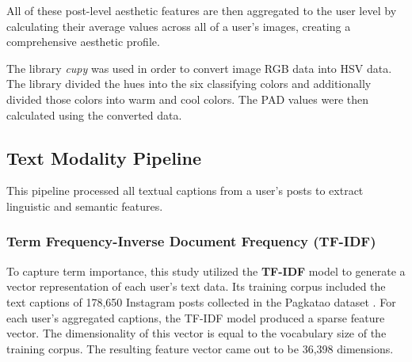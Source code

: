 All of these post-level aesthetic features are then aggregated to the user level by calculating their average values across all of a user's images, creating a comprehensive aesthetic profile.

The library \textit{cupy} \citep{Okuta2017CuPyA} was used in order to convert image RGB data into HSV data. The library divided the hues into the six classifying colors and additionally divided those colors into warm and cool colors. The PAD values were then calculated using the converted data.


\subsection{Text Modality Pipeline}
This pipeline processed all textual captions from a user's posts to extract linguistic and semantic features.

\subsubsection{Term Frequency-Inverse Document Frequency (TF-IDF)}
To capture term importance, this study utilized the \textbf{TF-IDF} model to generate a vector representation of each user's text data. Its training corpus included the text captions of 178,650 Instagram posts collected in the Pagkatao dataset \citep{tighe_acorda_2022}. For each user's aggregated captions, the TF-IDF model produced a sparse feature vector. The dimensionality of this vector is equal to the vocabulary size of the training corpus. The resulting feature vector came out to be 36,398 dimensions.

